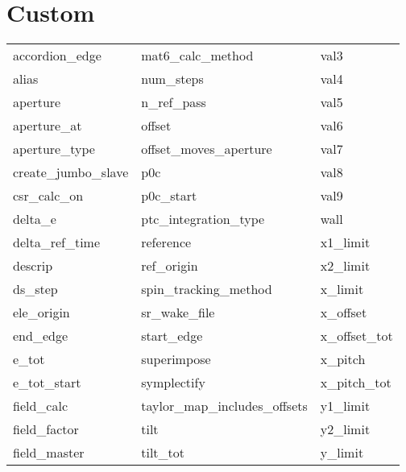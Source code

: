  \section{Custom}
 \label{s:list.custom}
 
 \begin{tabular}{lll} \toprule
accordion_edge              & mat6_calc_method            & val3                        \\
alias                       & num_steps                   & val4                        \\
aperture                    & n_ref_pass                  & val5                        \\
aperture_at                 & offset                      & val6                        \\
aperture_type               & offset_moves_aperture       & val7                        \\
create_jumbo_slave          & p0c                         & val8                        \\
csr_calc_on                 & p0c_start                   & val9                        \\
delta_e                     & ptc_integration_type        & wall                        \\
delta_ref_time              & reference                   & x1_limit                    \\
descrip                     & ref_origin                  & x2_limit                    \\
ds_step                     & spin_tracking_method        & x_limit                     \\
ele_origin                  & sr_wake_file                & x_offset                    \\
end_edge                    & start_edge                  & x_offset_tot                \\
e_tot                       & superimpose                 & x_pitch                     \\
e_tot_start                 & symplectify                 & x_pitch_tot                 \\
field_calc                  & taylor_map_includes_offsets & y1_limit                    \\
field_factor                & tilt                        & y2_limit                    \\
field_master                & tilt_tot                    & y_limit                     \\

\end{tabular}
